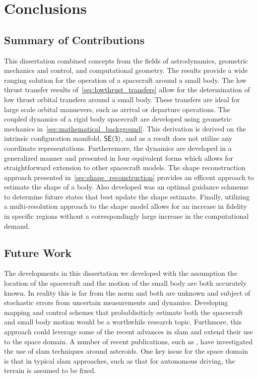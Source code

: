 
\chapter{Conclusions}\label{sec:conclusion}

\section{Summary of Contributions}

This dissertation combined concepts from the fields of astrodynamics, geometric mechanics and control, and computational geometry.
The results provide a wide ranging solution for the operation of a spacecraft around a small body.
The low thrust transfer results of~\cref{sec:lowthrust_transfers} allow for the determination of low thrust orbital transfers around a small body. 
These transfers are ideal for large scale orbital manuevers, such as arrival or departure operations.
The coupled dynamics of a rigid body spacecraft are developed using geometric mechanics in~\cref{sec:mathematical_background}.
This derivation is derived on the intrinsic configuration manifold, \( \mathsf{SE(3)} \), and as a result does not utilize any coordinate representations.
Furtheremore, the dynamics are developed in a generalized manner and presented in four equivalent forms which allows for straightforward extension to other spacecraft models.
The shape reconstruction approach presented in~\cref{sec:shape_reconstruction} provides an efficent approach to estimate the shape of a body. 
Also developed was an optimal guidance schmeme to determine future states that best update the shape estimate. 
Finally, utilizing a multi-resolution approach to the shape model allows for an increase in fidelity in specific regions without a correspondingly large increase in the computational demand.

\section{Future Work}

The developments in this dissertation we developed with the assumption the location of the spacecraft and the motion of the small body are both accurately known.
In reality this is far from the norm and both are unknown and subject of stochastic errors from uncertain measurements and dynamics. 
Developing mapping and control schemes that probablisiticly estimate both the spacecraft and small body motion would be a worthwhile research topic.
Furthmore, this approach could leverage some of the recent advances in \gls{slam} and extend their use to the space domain.
A number of recent publications, such as \textcite{cocaud2010,cocaud2012,vassallo2015,kulumani2017b}, have investigated the use of \gls{slam} techniques around asteroids.
One key issue for the space domain is that in typical \gls{slam} approaches, such as that for autonomous driving, the terrain is assumed to be fixed.

